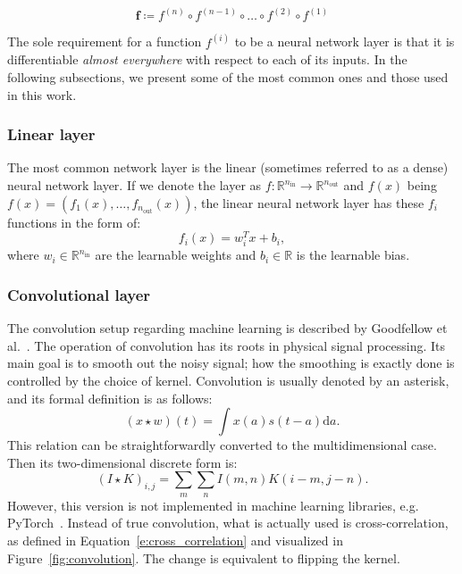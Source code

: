 \begin{equation}
    \mathbf{f} \coloneqq f^{(n)} \circ f^{(n-1)} \circ \dots \circ f^{(2)} \circ f^{(1)}
    \label{e:neural_network}
\end{equation}

The sole requirement for a function $f^{(i)}$ to be a neural network layer is that it is differentiable \textit{almost everywhere} with respect to each of its inputs.
In the following subsections, we present some of the most common ones and those used in this work.

\subsubsection{Linear layer}

The most common network layer is the linear (sometimes referred to as a dense) neural network layer. 
If we denote the layer as $f \colon \mathbb{R}^{n_{\text{in}}} \to \mathbb{R}^{n_{\text{out}}}$ and $f(x)$ being $f(x) = (f_1(x), \dots, f_{n_\text{out}}(x))$, the linear neural network layer has these $f_i$ functions in the form of:
\begin{equation}
    f_i(x) = w_i^Tx + b_i,
\end{equation}
where $w_i\in \mathbb{R}^{n_\text{in}}$ are the learnable weights and $b_i \in \mathbb{R}$ is the learnable bias.

\subsubsection{Convolutional layer}

The convolution setup regarding machine learning is described by Goodfellow et al.~\cite{Goodfellow2016}.
The operation of convolution has its roots in physical signal processing.
Its main goal is to smooth out the noisy signal; how the smoothing is exactly done is controlled by the choice of kernel.
Convolution is usually denoted by an asterisk, and its formal definition is as follows:
\begin{equation}
    (x \star w)(t) = \int x(a)s(t-a) \mathrm{d}a .
\end{equation}
This relation can be straightforwardly converted to the multidimensional case.
Then its two-dimensional discrete form is:
\begin{equation}
    (I \star K)_{i,j} = \sum_m\sum_nI(m, n)K(i-m, j-n).
\end{equation}
However, this version is not implemented in machine learning libraries, e.g. PyTorch~\cite{PyTorchConv2d}.
Instead of true convolution, what is actually used is cross-correlation, as defined in Equation~\eqref{e:cross_correlation} and visualized in Figure~\ref{fig:convolution}.
The change is equivalent to flipping the kernel.


